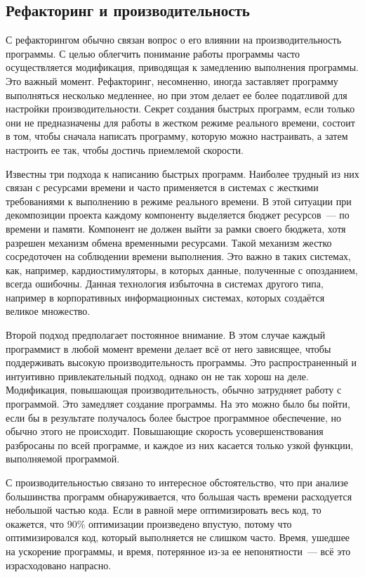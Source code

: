 \documentclass{../../text-style}
\begin{document}
\subsection{Рефакторинг и производительность}

С рефакторингом обычно связан вопрос о его влиянии на производительность программы. С целью облегчить понимание работы программы часто осуществляется модификация, приводящая к замедлению выполнения программы. Это важный момент. Рефакторинг, несомненно, иногда заставляет программу выполняться несколько медленнее, но при этом делает ее более податливой для настройки производительности. Секрет создания быстрых программ, если только они не предназначены для работы в жестком режиме реального времени, состоит в том, чтобы сначала написать программу, которую можно настраивать, а затем настроить ее так, чтобы достичь приемлемой скорости.

Известны три подхода к написанию быстрых программ. Наиболее трудный из них связан с ресурсами времени и часто применяется в системах с жесткими требованиями к выполнению в режиме реального времени. В этой ситуации при декомпозиции проекта каждому компоненту выделяется бюджет ресурсов~--- по времени и памяти. Компонент не должен выйти за рамки своего бюджета, хотя разрешен механизм обмена временными ресурсами. Такой механизм жестко сосредоточен на соблюдении времени выполнения. Это важно в таких системах, как, например, кардиостимуляторы, в которых данные, полученные с опозданием, всегда ошибочны. Данная технология избыточна в системах другого типа, например в корпоративных информационных системах, которых создаётся великое множество.

Второй подход предполагает постоянное внимание. В этом случае каждый программист в любой момент времени делает всё от него зависящее, чтобы поддерживать высокую производительность программы. Это распространенный и интуитивно привлекательный подход, однако он не так хорош на деле. Модификация, повышающая производительность, обычно затрудняет работу с программой. Это замедляет создание программы. На это можно было бы пойти, если бы в результате получалось более быстрое программное обеспечение, но обычно этого не происходит. Повышающие скорость усовершенствования разбросаны по всей программе, и каждое из них касается только узкой функции, выполняемой программой.

С производительностью связано то интересное обстоятельство, что при анализе большинства программ обнаруживается, что большая часть времени расходуется небольшой частью кода. Если в равной мере оптимизировать весь код, то окажется, что 90\% оптимизации произведено впустую, потому что оптимизировался код, который выполняется не слишком часто. Время, ушедшее на ускорение программы, и время, потерянное из-за ее непонятности~--- всё это израсходовано напрасно.
\end{document}

